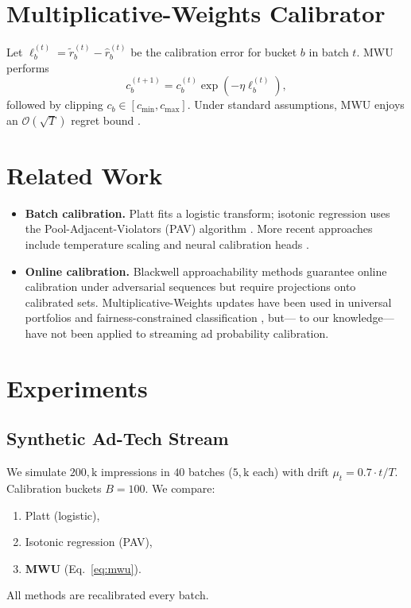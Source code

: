 \documentclass[12pt, letterpaper]{article}
\begin{document}
\section{Multiplicative-Weights Calibrator}
Let $\ell_b^{(t)} = \tilde{r}_b^{(t)} - \hat{r}_b^{(t)}$ be the calibration error for bucket $b$ in batch $t$. MWU performs
\begin{equation}
c_b^{(t+1)} = c_b^{(t)}\exp\left(-\eta \ell_b^{(t)}\right),
\label{eq:mwu}
\end{equation}
followed by clipping $c_b \in \left[c_{\min}, c_{\max}\right]$. Under standard assumptions, MWU enjoys an $\mathcal{O}(\sqrt{T})$ regret bound
\citep{Arora12}.

\section{Related Work}
\begin{itemize}
\item \textbf{Batch calibration.}  Platt \citep{Platt99} fits a logistic transform; isotonic regression uses the Pool-Adjacent-Violators (PAV) algorithm \citep{Zadrozny02}. More recent approaches include temperature scaling \citep{Guo17} and neural calibration heads \citep{Kull19}.

\item \textbf{Online calibration.}  Blackwell approachability methods \citep{Foster18} guarantee online calibration under adversarial sequences but require projections onto calibrated sets. Multiplicative-Weights updates have been used in universal portfolios \citep{Cover91} and fairness-constrained classification \citep{Agarwal18}, but— to our knowledge—have not been applied to streaming ad probability calibration.
\end{itemize}

\section{Experiments}
\subsection{Synthetic Ad-Tech Stream}
We simulate $200,\text{k}$ impressions in $40$ batches ($5,\text{k}$ each) with drift $\mu_t = 0.7 \cdot t/T$. Calibration buckets $B=100$.
We compare:
\begin{enumerate}
\item Platt (logistic),
\item Isotonic regression (PAV),
\item \textbf{MWU} (Eq.~\ref{eq:mwu}).
\end{enumerate}
All methods are recalibrated every batch.
\end{document}
